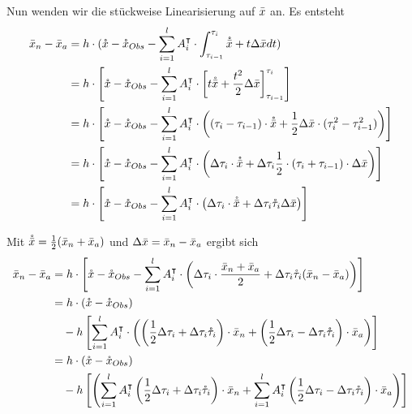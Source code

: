 Nun wenden wir die stückweise Linearisierung auf $\bar{x}$ an. Es entsteht
\allowdisplaybreaks
\begin{align*}
\bar{x}_n - \bar{x}_a &= h\cdot (\mathring{x} -\mathring{x}_{Obs} - \sum_{i=1}^l A_i^\intercal \cdot \int_{\tau_{i-1}}^{\tau_{i}} \mathring{\bar{x}} + t\Delta \bar{x} dt)\\
		  &= h\cdot \left[\mathring{x} -\mathring{x}_{Obs} - \sum_{i=1}^l A_i^\intercal \cdot \left[t\mathring{\bar{x}} + \frac{t^2}{2}\Delta \bar{x} \right]_{\tau_{i-1}}^{\tau_i} \right]\\
		  &= h\cdot \left[\mathring{x} -\mathring{x}_{Obs} - \sum_{i=1}^l A_i^\intercal \cdot \left( (\tau_i - \tau_{i-1})\cdot \mathring{\bar{x}} + \frac{1}{2}\Delta \bar{x} \cdot(\tau_i^2-\tau_{i-1}^2) \right)\right]\\
		  &= h\cdot \left[\mathring{x} -\mathring{x}_{Obs} - \sum_{i=1}^l A_i^\intercal \cdot \left(\Delta \tau_i\cdot \mathring{\bar{x}} +  \Delta \tau_i \frac{1}{2}\cdot(\tau_i+\tau_{i-1})\cdot \Delta \bar{x} \right)\right]\\
		  &= h\cdot \left[\mathring{x} -\mathring{x}_{Obs} - \sum_{i=1}^l A_i^\intercal \cdot \left( \Delta \tau_i\cdot \mathring{\bar{x}} +  \Delta \tau_i \mathring{\tau}_i \Delta \bar{x} \right)\right]
\end{align*}

Mit $\mathring{\bar{x}} =\frac{1}{2}(\bar{x}_n + \bar{x}_a) $ und $\Delta \bar{x} =\bar{x}_n - \bar{x}_a $ ergibt sich
\allowdisplaybreaks
\begin{align*}
\bar{x}_n - \bar{x}_a &= h\cdot \left[\mathring{x} -\mathring{x}_{Obs} - \sum_{i=1}^l A_i^\intercal \cdot \left( \Delta \tau_i\cdot \frac{\bar{x}_n + \bar{x}_a}{2} +  \Delta \tau_i \mathring{\tau}_i (\bar{x}_n - \bar{x}_a) \right)\right]\\
 &= h\cdot \left(\mathring{x} -\mathring{x}_{Obs}\right) \\
 &\quad-h\left[\sum_{i=1}^l A_i^\intercal \cdot \left( \left(\frac{1}{2} \Delta \tau_i +\Delta \tau_i \mathring{\tau}_i\right) \cdot \bar{x}_n  +  \left(\frac{1}{2}\Delta \tau_i-\Delta \tau_i \mathring{\tau}_i\right) \cdot \bar{x}_a \right)\right]\\
 &= h\cdot \left(\mathring{x} -\mathring{x}_{Obs} \right)\\
 &\quad-h \left[\left( \sum_{i=1}^l A_i^\intercal \left(\frac{1}{2} \Delta \tau_i +\Delta \tau_i \mathring{\tau}_i\right) \cdot \bar{x}_n  + \sum_{i=1}^l A_i^\intercal  \left(\frac{1}{2}\Delta \tau_i-\Delta \tau_i \mathring{\tau}_i\right) \cdot \bar{x}_a \right)\right]\\
\end{align*}
 
